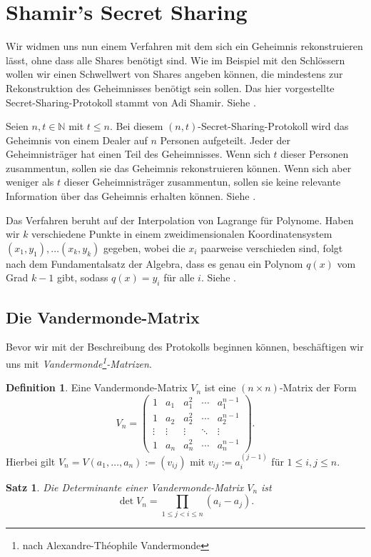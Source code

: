 \documentclass[12pt, a4paper, oneside, titlepage]{report}
\newcommand{\N}{\mathds{N}}
\newtheorem{satz}[lemma]{Satz}
\theoremstyle{definition}
\newtheorem{def1}[lemma]{Definition}
\begin{document}
	\section{Shamir's Secret Sharing}
	
	Wir widmen uns nun einem Verfahren mit dem sich ein Geheimnis rekonstruieren lässt, ohne dass alle Shares benötigt sind. Wie im Beispiel mit den Schlössern wollen wir einen Schwellwert von Shares angeben können, die mindestens zur Rekonstruktion des Geheimnisses benötigt sein sollen. Das hier vorgestellte Secret-Sharing-Protokoll stammt von Adi Shamir. Siehe \cite{shamir}.
	
	Seien $ n, t \in \N $ mit $ t \leq n $. Bei diesem $ (n,t) $-Secret-Sharing-Protokoll wird das Geheimnis von einem Dealer auf $ n $ Personen aufgeteilt. Jeder der Geheimnisträger hat einen Teil des Geheimnisses. Wenn sich $ t $ dieser Personen zusammentun, sollen sie das Geheimnis rekonstruieren können. Wenn sich aber weniger als $ t $ dieser Geheimnisträger zusammentun, sollen sie keine relevante Information über das Geheimnis erhalten können. Siehe \cite{buchmann}.
	
	Das Verfahren beruht auf der Interpolation von Lagrange für Polynome. Haben wir $ k $ verschiedene Punkte in einem zweidimensionalen Koordinatensystem $ (x_1, y_1), \dots (x_k, y_k) $ gegeben, wobei die $ x_i $ paarweise verschieden sind, folgt nach dem Fundamentalsatz der Algebra, dass es genau ein Polynom $ q(x) $ vom Grad $ k - 1 $ gibt, sodass $ q(x) =y_i $ für alle $ i $. Siehe \cite{shamir}.
	
	\subsection{Die Vandermonde-Matrix}
	
	Bevor wir mit der Beschreibung des Protokolls beginnen können, beschäftigen wir uns mit \emph{Vandermonde\footnote{nach Alexandre-Théophile Vandermonde}-Matrizen}.
	
	\begin{def1}
		Eine Vandermonde-Matrix $ V_n $ ist eine $ (n \times n) $-Matrix der Form
	$$V_n =
	\begin{pmatrix}
	1 & a_1 & a_1^2 & \cdots & a_1^{n-1} \\
	1 & a_2 & a_2^2 & \cdots & a_2^{n-1} \\
	\vdots & \vdots & \vdots & \ddots & \vdots \\     
	1 & a_n & a_n^2 & \cdots & a_n^{n-1}
	\end{pmatrix}.$$
	Hierbei gilt $V_n = V(a_1, \dots, a_n) := (v_{ij}) $ mit $ v_{ij} := a_i^{(j-1)} $ für $ 1 \leq i, j \leq n$.
	\end{def1}
	\begin{satz}
		Die Determinante einer Vandermonde-Matrix $ V_n $ ist
		$$ \det V_n = \prod_{1 \leq j < i \leq n} (a_i - a_j). $$
	\end{satz}
\end{document}
